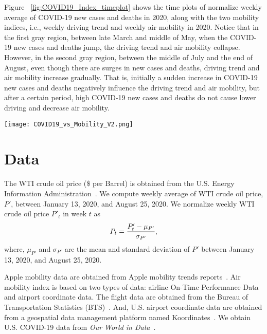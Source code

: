 \documentclass[review]{elsarticle}
\begin{document}
Figure ~\ref{fig:COVID19_Index_timeplot} shows the time plots of normalize weekly average of COVID-19 new cases and deaths in 2020, along with the two mobility indices, i.e., weekly driving trend and weekly air mobility in 2020. Notice that in the first gray region, between late March and middle of May, when the COVID-19 new cases and deaths jump, the driving trend and air mobility collapse. However, in the second gray region, between the middle of July and the end of August, even though there are surges in new cases and deaths, driving trend and air mobility increase gradually. That is, initially a sudden increase in COVID-19 new cases and deaths negatively influence the driving trend and air mobility, but after a certain period, high COVID-19 new cases and deaths do not cause lower driving and decrease air mobility.




\begin{figure*}[!ht]
\centering
  \texttt{[image: COVID19\_vs\_Mobility\_V2.png]}
	\caption{Time plots of normalize weekly average of COVID-19 variables (new cases and new deaths in the US) and normalize weekly average mobility metrics from January 2020 to September 2020.}
	\label{fig:COVID19_Index_timeplot}
\end{figure*}




\section{Data}
\label{sec:Data} 

The WTI crude oil price (\$ per Barrel) is obtained from the U.S. Energy Information Administration~\citep{EIA_Data}. 
We compute weekly average of WTI crude oil price, $P'$, between January 13, 2020, and August 25, 2020.
We normalize weekly WTI crude oil price $P'_t$ in week $t$ as
\begin{eqnarray}\label{eq:WTI}
P_t= {{P'_t-  \mu_{P'}} \over {\sigma_{P'}}},
\end{eqnarray}
where, $\mu_{P'}$ and $\sigma_{{P'}}$ are the mean and standard deviation of $P'$ between January 13, 2020, and August 25, 2020.

Apple mobility data are obtained from Apple mobility trends reports~\citep{appleMob}. Air mobility index is based on two types of data: airline On-Time Performance Data and airport coordinate data. The flight data are obtained from the Bureau of Transportation Statistics (BTS)~\citep{BTS2020}. 
And, U.S. airport coordinate data are obtained from a geospatial data management platform named Koordinates~\citep{Koordinates2020}. 
We obtain U.S. COVID-19 data from \textit{Our World in Data}~\citep{ourworld2020}.
\end{document}
